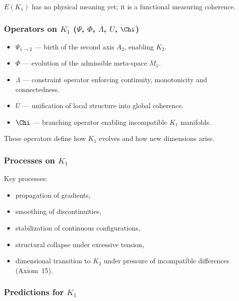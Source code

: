 $E(K_1)$ has no physical meaning yet; it is a functional measuring
coherence.

\subsubsection{Operators on \texorpdfstring{$K_1$}{K_1} (\texorpdfstring{$\Psi$}{\Psi}, \texorpdfstring{$\Phi$}{\Phi}, \texorpdfstring{$\Lambda$}{\Lambda}, \texorpdfstring{$U$}{U}, \texorpdfstring{$\Chi$}{\Chi})}

\begin{itemize}
    \item $\Psi_{1\to2}$ — birth of the second axis $A_2$, enabling
          $K_2$.
    \item $\Phi$ — evolution of the admissible meta-space $M_1$.
    \item $\Lambda$ — constraint operator enforcing continuity,
          monotonicity and connectedness.
    \item $U$ — unification of local structure into global coherence.
    \item $\Chi$ — branching operator enabling incompatible $K_1$
          manifolds.
\end{itemize}

These operators define how $K_1$ evolves and how new dimensions arise.

\subsubsection{Processes on \texorpdfstring{$K_1$}{K_1}}

Key processes:
\begin{itemize}
    \item propagation of gradients,
    \item smoothing of discontinuities,
    \item stabilization of continuous configurations,
    \item structural collapse under excessive tension,
    \item dimensional transition to $K_2$ under pressure of
          incompatible differences (Axiom~15).
\end{itemize}

\subsubsection{Predictions for \texorpdfstring{$K_1$}{K_1}}

